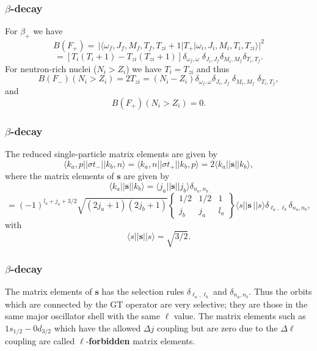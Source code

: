 \documentclass{beamer}
\begin{document}
\begin{frame}
\frametitle{$\beta$-decay}

\begin{block}{}
For $\beta_{ + }$ we have
\[
B(F_{+}) =\, \vert \langle \omega _{f},J_{f},M_{f},T_{f},T_{zi}+1\vert T_{+}\vert \omega 
_{i},J_{i},M_{i},T_{i},T_{zi}\rangle\vert ^{2}
\]
\[
= [T_{i}(T_{i}+1)-T_{zi}(T_{zi}+1)]
\delta _{\omega _{f},\omega }\;\delta _{J_{i},J_{f}}\delta _{M_{i},M_{f}}\delta _{T_{i},T_{f}}. 
\]
For neutron-rich nuclei ($N_{i}> Z_{i}$) we have $T_{i}=T_{zi}$ and thus
\[
B(F_{-})(N_{i}> Z_{i}) = 2T_{zi} = (N_{i}-Z_{i})\delta _{\omega _{f},\omega }\delta _{J_{i},J_{f}}\;\delta _{M_{i},M_{f}}\;\delta _{T_{i},T_{f}}, 
\]
and
\[
B(F_{+})(N_{i}> Z_{i}) = 0. 
\]
\end{block}
\end{frame}

\begin{frame}
\frametitle{$\beta$-decay}

\begin{block}{}
The reduced single-particle
matrix elements are given by
\[
\langle k_{a},p\vert\vert \sigma  t_{-}\vert\vert k_{b},n\rangle=\langle k_{a},n\vert\vert \sigma  t_{+}\vert\vert k_{b},p\rangle= 2\langle k_{a}\vert\vert \mathbf{s}\vert\vert k_{b}\rangle, 
\]
where the matrix elements of $\mathbf{s}$ are given by
\[
\langle k_{a}\vert\vert \mathbf{s}\vert\vert k_{b}\rangle=\langle j_{a}\vert\vert \mathbf{s}\vert\vert j_{b}\rangle \delta_{n_{a},n_{b}}
\]
\[
=(-1)^{l_{a}+j_{a}+3/2}
\sqrt{(2j_{a}+1)(2j_{b}+1)}\left\{\begin{array}{ccc}  {1/2}&  {1/2}&  {1} \\ {j_{b}}&  {j_{a}}&  {l_{a}}\end{array}\right\}
\langle s\vert\vert \mathbf{s}\,\vert\vert s\rangle \delta _{\ell _{a},\ell _{b}} \delta_{n_{a},n_{b}}
,
\]
with
\[
\langle s\vert\vert \mathbf{s}\vert\vert s\rangle= \sqrt{3/2}.
\]
\end{block}
\end{frame}

\begin{frame}
\frametitle{$\beta$-decay}

\begin{block}{}
The matrix elements of $\mathbf{s}$ has the selection rules $\delta_{ \ell_{a} , \ell_{b} }$
and $\delta_{n _{a} ,n _{b} }$. Thus the orbits which are connected by the GT operator
are very selective; they are those in the same major oscillator shell
with the same $\ell$ value. The matrix elements such as
$1s_{1/2}-0d_{3/2}$ which have the allowed $\Delta j$ coupling but
are zero due to the $\Delta\ell$ coupling are called $\ell$-\textbf{forbidden} matrix
elements.
\end{block}
\end{frame}
\end{document}
